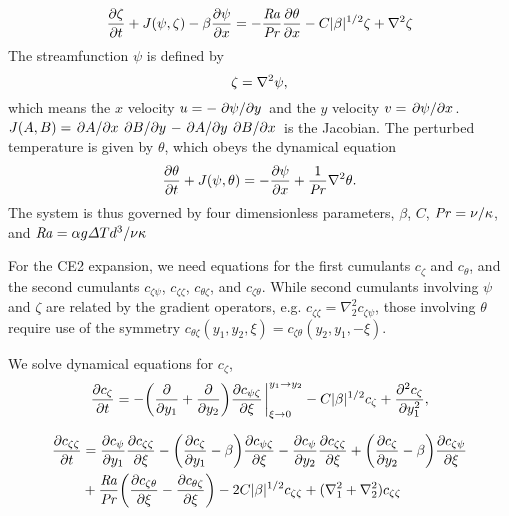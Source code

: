 \documentclass{jfm}
\newcommand{\cz}{c_{\zeta}}
\newcommand{\cs}{c_{\psi}}
\newcommand{\ct}{c_{\theta}}
\newcommand{\csz}{c_{\psi \zeta}}
\newcommand{\czs}{c_{\zeta \psi}}
\newcommand{\czz}{c_{\zeta \zeta}}
\newcommand{\ctz}{c_{\theta \zeta}}
\newcommand{\czt}{c_{\zeta \theta}}
\newcommand{\Ray}{\mbox{\textit{Ra}}}  %
\begin{document}
\begin{equation}
  \label{eq:zeta_eom}
  \pdv{\zeta}{t} + J(\psi, \zeta) - \beta \pdv{\psi}{x} = -\frac{\Ray}{\Pran} \pdv{\theta}{x} -C |\beta|^{1/2} \zeta + \laplacian{\zeta}
\end{equation}
The streamfunction $\psi$ is defined by
\begin{equation}
  \label{eq:zeta_def}
  \zeta = \laplacian{\psi},
\end{equation}
which means the $x$ velocity $u = -\pdv*{\psi}{y}$ and the $y$ velocity $v = \pdv*{\psi}{x}$. $J(A, B) = \pdv*{A}{x}\pdv*{B}{y} - \pdv*{A}{y}\pdv*{B}{x}$ is the Jacobian. 
The perturbed temperature is given by $\theta$, which obeys the dynamical equation
%
\begin{equation}
  \label{eq:theta}
  \pdv{\theta}{t} + J(\psi, \theta) = -\pdv{\psi}{x} + \frac{1}{\mbox{\textit{Pr}}} \nabla^2 \theta.
\end{equation}
The system is thus governed by four dimensionless parameters, $\beta$, $C$, $\mbox{\textit{Pr}} = \nu/
\kappa$, and $\Ray = \alpha g \Delta T d^3/\nu \kappa$

For the CE2 expansion, we need equations for the first cumulants $\cz$ and $\ct$, and the second cumulants $\czs$, $\czz$, $\ctz$, and $\czt$. 
While second cumulants involving $\psi$ and $\zeta$ are related by the gradient operators, e.g. $\czz = \nabla_2^2 \czs$, those involving $\theta$ require use of the symmetry $\ctz(y_1, y_2, \xi) = \czt(y_2, y_1, -\xi)$.

We solve dynamical equations for $\cz$,
\begin{equation}
  \label{eq:cz}
  \pdv{\cz}{t} = - \qty(\pdv{y_1} + \pdv{y_2}) \pdv{\csz}{\xi}\eval_{\xi \to 0}^{y_1 \to y_2} - C |\beta|^{1/2} \cz + \pdv[2]{\cz}{y_1},
\end{equation}

\begin{equation}
  \label{eq:czz}
  \begin{split}
    \pdv{\czz}{t} &= \pdv{\cs}{y_1} \pdv{\czz}{\xi} - \qty(\pdv{\cz}{y_1} - \beta) \pdv{\csz}{\xi} - \pdv{\cs}{y_2} \pdv{\czz}{\xi}  + \qty(\pdv{\cz}{y_2} - \beta) \pdv{\czs}{\xi}\\
    &+ \frac{\Ray}{\Pran} \qty(\pdv{\czt}{\xi} -  \pdv{\ctz}{\xi}) - 2C |\beta|^{1/2} \czz + (\nabla_1^2 + \nabla_2^2) \czz    
  \end{split}
\end{equation}
\end{document}
